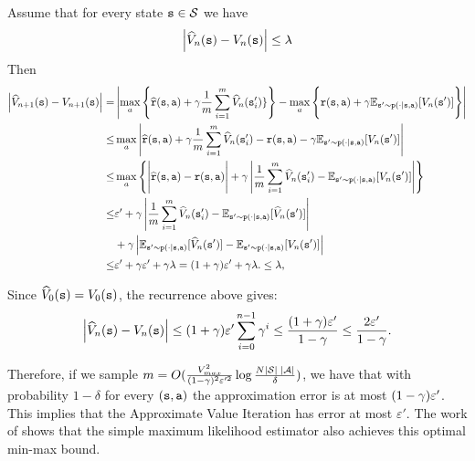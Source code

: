Assume that for every state ${\tt s} \in \mathcal{S}$  we have
\[
\left|\widehat{V}_n({\tt s}) - V_n({\tt s})\right|\leq \lambda
\]
Then
\begin{align*}
\left|\widehat{V}_{n+1}(\state)-V_{n+1}(\state)\right| =&
\left|\max_a\left\{\widehat{\reward}(\state,\action)+\discount
\frac{1}{m}\sum_{i=1}^m \widehat{V}_n(\state'_i)\}\right\} 
- \max_a 
\Bigg\{
\reward(\state,\action)+\discount \E_{\state'\sim \transitionprob(\cdot
|\state,\action)} [V_n(\state')] 
\Bigg\}
\right|\\
\leq& \max_a\left|\widehat{\reward}(\state,\action)+\discount
\frac{1}{m}\sum_{i=1}^m \widehat{V}_n(\state'_i) - 
\reward(\state,\action)-\discount \E_{\state'\sim \transitionprob(\cdot
|\state,\action)} [V_n(\state')] \right|\\
\leq& \max_a \left\{\Bigg|\widehat{\reward}(\state,\action)- \reward(\state,\action)\Bigg|
+\discount \left| \frac{1}{m}\sum_{i=1}^m \widehat{V}_n(\state'_i) -
\E_{\state'\sim \transitionprob(\cdot
|\state,\action)} [V_n(\state')] \right| \right\}\\
%
\leq & \varepsilon' + \discount \left| \frac{1}{m}\sum_{i=1}^m \widehat{V}_n(\state'_i) -
\E_{\state'\sim \transitionprob(\cdot
|\state,\action)} [\widehat{V}_n(\state')] \right| \\
&+ \discount \left| \E_{\state'\sim \transitionprob(\cdot
|\state,\action)} [\widehat{V}_n(\state')] -
\E_{\state'\sim \transitionprob(\cdot
|\state,\action)} [V_n(\state')] \right|\\
 \leq & \varepsilon'+\discount\varepsilon' +\discount\lambda = (1+\discount)\varepsilon' +\discount\lambda.
 \leq \lambda,
\end{align*}

Since $\widehat{V}_0({\tt s}) = V_0({\tt s})$, the recurrence above gives:
\[
\left|\widehat{V}_n({\tt s}) - V_n({\tt s})\right|\leq (1+\gamma)\varepsilon'\sum_{i=0}^{n-1}\gamma^i \leq \frac{(1+\gamma)\varepsilon'}{1-\gamma} \leq \frac{2\varepsilon'}{1-\gamma}.
\]

Therefore, if we sample $m=O(\frac{V^2_{max}}{(1-\gamma)^2\varepsilon'^2}\log \frac{N
|\mathcal{S}| \;|\mathcal{A}|}{\delta})$, we have that with probability
$1-\delta$ for every $({\tt s},{\tt a})$ the approximation error is
at most $(1-\gamma)\varepsilon'$. This implies that the Approximate Value
Iteration has error at most $\varepsilon'$.
The work of \cite{AgarwalKY20} shows that the simple maximum likelihood estimator also achieves this optimal min-max bound.


